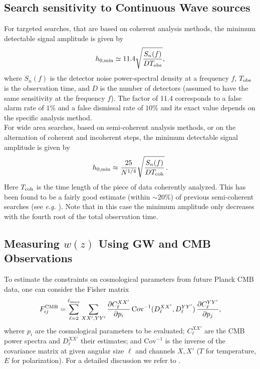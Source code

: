 \subsection{Search sensitivity to Continuous Wave sources}
\label{box:h0min}
For targeted searches, that are based on coherent analysis methods, the minimum detectable signal amplitude is given by
\begin{equation}
  h_{0,\rm min} \simeq 11.4\sqrt{\frac{S_n(f)}{DT_{\rm obs}}},
\label{hmin}
\end{equation}
where $S_n(f)$ is the detector noise power-spectral density at a
frequency $f$, $T_{\rm obs}$ is the observation time, and $D$ is the
number of detectors (assumed to have the same sensitivity at the frequency $f$).  The factor of 11.4 corresponds to a false alarm
rate of $1\%$ and a false dismissal rate of $10\%$ and its exact value depends on the specific analysis method. \\  
For wide area searches, based on semi-coherent analysis methods, or on the alternation of coherent and incoherent steps, the minimum detectable signal amplitude is given by
\begin{equation}
  h_{0,\rm min} \approx
  \frac{25}{N^{1/4}}\sqrt{\frac{S_n(f)}{DT_{\rm coh}}}\,.
\label{hmin_blind}
\end{equation}
Here $T_{\rm coh}$ is the time length of the piece of data coherently analyzed.
This has been found to be a fairly good estimate (within $\sim 20\%$)
of previous semi-coherent searches (see {\em e.g.} \cite{Abbott:2005pu}).
Note that in this case the minimum amplitude only decreases with the fourth root of the total observation time. 

\subsection{Measuring $w(z)$ Using GW and CMB Observations}
\label{sec:wandwz}

To estimate the constraints on cosmological parameters from future 
Planck CMB data, one can consider the Fisher matrix
\begin{equation}
F_{ij}^{\rm CMB} = \sum_{\ell = 2}^{\ell_{max}} \sum_{X X', Y Y'} 
\frac{\partial C_\ell^{X X'}}{\partial p_i}\,
\mbox{Cov}^{-1}(D_\ell^{X X'}, D_\ell^{Y Y'})\,
\frac{\partial C_\ell^{Y Y'}}{\partial p_j},
\end{equation}
wherer $p_i$ are the cosmological parameters to be evaluated; 
$C_\ell^{X X'}$ are the CMB power spectra and
$D_\ell^{X X'}$ their estimates; and $\mbox{Cov}^{-1}$ is the 
inverse of the covariance matrix at given
angular size $\ell$ and channels $X, X'$ ($T$ for temperature, 
$E$ for polarization). For a detailed
discussion we refer to \cite{Zhao:2010}.

